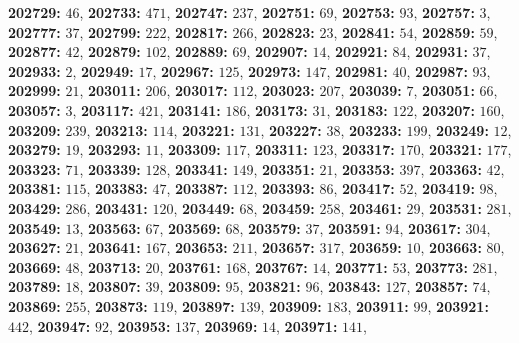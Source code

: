 \textsf{\bfseries 202729:} $46$, \textsf{\bfseries 202733:} $471$, \textsf{\bfseries 202747:} $237$, \textsf{\bfseries 202751:} $69$, \textsf{\bfseries 202753:} $93$, \textsf{\bfseries 202757:} $3$, \textsf{\bfseries 202777:} $37$, \textsf{\bfseries 202799:} $222$, \textsf{\bfseries 202817:} $266$, \textsf{\bfseries 202823:} $23$, \textsf{\bfseries 202841:} $54$, \textsf{\bfseries 202859:} $59$, \textsf{\bfseries 202877:} $42$, \textsf{\bfseries 202879:} $102$, \textsf{\bfseries 202889:} $69$, \textsf{\bfseries 202907:} $14$, \textsf{\bfseries 202921:} $84$, \textsf{\bfseries 202931:} $37$, \textsf{\bfseries 202933:} $2$, \textsf{\bfseries 202949:} $17$, \textsf{\bfseries 202967:} $125$, \textsf{\bfseries 202973:} $147$, \textsf{\bfseries 202981:} $40$, \textsf{\bfseries 202987:} $93$, \textsf{\bfseries 202999:} $21$, \textsf{\bfseries 203011:} $206$, \textsf{\bfseries 203017:} $112$, \textsf{\bfseries 203023:} $207$, \textsf{\bfseries 203039:} $7$, \textsf{\bfseries 203051:} $66$, \textsf{\bfseries 203057:} $3$, \textsf{\bfseries 203117:} $421$, \textsf{\bfseries 203141:} $186$, \textsf{\bfseries 203173:} $31$, \textsf{\bfseries 203183:} $122$, \textsf{\bfseries 203207:} $160$, \textsf{\bfseries 203209:} $239$, \textsf{\bfseries 203213:} $114$, \textsf{\bfseries 203221:} $131$, \textsf{\bfseries 203227:} $38$, \textsf{\bfseries 203233:} $199$, \textsf{\bfseries 203249:} $12$, \textsf{\bfseries 203279:} $19$, \textsf{\bfseries 203293:} $11$, \textsf{\bfseries 203309:} $117$, \textsf{\bfseries 203311:} $123$, \textsf{\bfseries 203317:} $170$, \textsf{\bfseries 203321:} $177$, \textsf{\bfseries 203323:} $71$, \textsf{\bfseries 203339:} $128$, \textsf{\bfseries 203341:} $149$, \textsf{\bfseries 203351:} $21$, \textsf{\bfseries 203353:} $397$, \textsf{\bfseries 203363:} $42$, \textsf{\bfseries 203381:} $115$, \textsf{\bfseries 203383:} $47$, \textsf{\bfseries 203387:} $112$, \textsf{\bfseries 203393:} $86$, \textsf{\bfseries 203417:} $52$, \textsf{\bfseries 203419:} $98$, \textsf{\bfseries 203429:} $286$, \textsf{\bfseries 203431:} $120$, \textsf{\bfseries 203449:} $68$, \textsf{\bfseries 203459:} $258$, \textsf{\bfseries 203461:} $29$, \textsf{\bfseries 203531:} $281$, \textsf{\bfseries 203549:} $13$, \textsf{\bfseries 203563:} $67$, \textsf{\bfseries 203569:} $68$, \textsf{\bfseries 203579:} $37$, \textsf{\bfseries 203591:} $94$, \textsf{\bfseries 203617:} $304$, \textsf{\bfseries 203627:} $21$, \textsf{\bfseries 203641:} $167$, \textsf{\bfseries 203653:} $211$, \textsf{\bfseries 203657:} $317$, \textsf{\bfseries 203659:} $10$, \textsf{\bfseries 203663:} $80$, \textsf{\bfseries 203669:} $48$, \textsf{\bfseries 203713:} $20$, \textsf{\bfseries 203761:} $168$, \textsf{\bfseries 203767:} $14$, \textsf{\bfseries 203771:} $53$, \textsf{\bfseries 203773:} $281$, \textsf{\bfseries 203789:} $18$, \textsf{\bfseries 203807:} $39$, \textsf{\bfseries 203809:} $95$, \textsf{\bfseries 203821:} $96$, \textsf{\bfseries 203843:} $127$, \textsf{\bfseries 203857:} $74$, \textsf{\bfseries 203869:} $255$, \textsf{\bfseries 203873:} $119$, \textsf{\bfseries 203897:} $139$, \textsf{\bfseries 203909:} $183$, \textsf{\bfseries 203911:} $99$, \textsf{\bfseries 203921:} $442$, \textsf{\bfseries 203947:} $92$, \textsf{\bfseries 203953:} $137$, \textsf{\bfseries 203969:} $14$, \textsf{\bfseries 203971:} $141$, 
